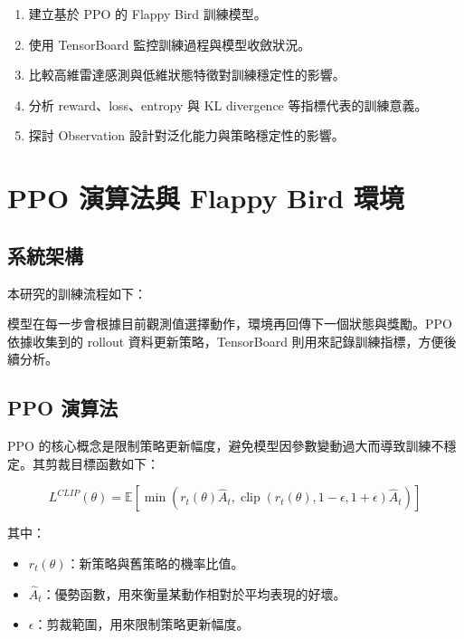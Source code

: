 \documentclass[12pt,a4paper]{ctexart}
\begin{document}
\begin{enumerate}
  \item 建立基於 PPO 的 Flappy Bird 訓練模型。
  \item 使用 TensorBoard 監控訓練過程與模型收斂狀況。
  \item 比較高維雷達感測與低維狀態特徵對訓練穩定性的影響。
  \item 分析 reward、loss、entropy 與 KL divergence 等指標代表的訓練意義。
  \item 探討 Observation 設計對泛化能力與策略穩定性的影響。
\end{enumerate}

\section{PPO 演算法與 Flappy Bird 環境}

\subsection{系統架構}

本研究的訓練流程如下：

\begin{center}
\end{center}

模型在每一步會根據目前觀測值選擇動作，環境再回傳下一個狀態與獎勵。PPO 依據收集到的 rollout 資料更新策略，TensorBoard 則用來記錄訓練指標，方便後續分析。

\subsection{PPO 演算法}

PPO 的核心概念是限制策略更新幅度，避免模型因參數變動過大而導致訓練不穩定。其剪裁目標函數如下：

\[
L^{CLIP}(\theta)=
\mathbb{E}\left[
\min\left(
r_t(\theta)\hat{A}_t,
\operatorname{clip}(r_t(\theta), 1-\epsilon, 1+\epsilon)\hat{A}_t
\right)
\right]
\]

其中：

\begin{itemize}
  \item $r_t(\theta)$：新策略與舊策略的機率比值。
  \item $\hat{A}_t$：優勢函數，用來衡量某動作相對於平均表現的好壞。
  \item $\epsilon$：剪裁範圍，用來限制策略更新幅度。
\end{itemize}
\end{document}

